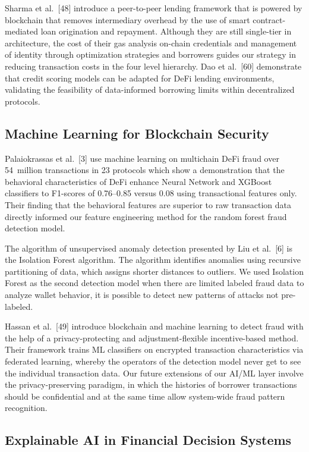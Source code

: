 \documentclass[12pt,a4paper]{report}
\begin{document}
Sharma et al.~[48] introduce a peer-to-peer lending framework that is powered by blockchain that removes intermediary overhead by the use of smart contract-mediated loan origination and repayment. Although they are still single-tier in architecture, the cost of their gas analysis on-chain credentials and management of identity through optimization strategies and borrowers guides our strategy in reducing transaction costs in the four level hierarchy. Dao et al.~[60] demonstrate that credit scoring models can be adapted for DeFi lending environments, validating the feasibility of data-informed borrowing limits within decentralized protocols.

\subsection{Machine Learning for Blockchain Security}

Palaiokrassas et al.~[3] use machine learning on multichain DeFi fraud over 54~million transactions in 23 protocols which show a demonstration that the behavioral characteristics of DeFi enhance Neural Network and XGBoost classifiers to F1-scores of 0.76--0.85 versus 0.08 using transactional features only. Their finding that the behavioral features are superior to raw transaction data directly informed our feature engineering method for the random forest fraud detection model.

The algorithm of unsupervised anomaly detection presented by Liu et al.~[6] is the Isolation Forest algorithm. The algorithm identifies anomalies using recursive partitioning of data, which assigns shorter distances to outliers. We used Isolation Forest as the second detection model when there are limited labeled fraud data to analyze wallet behavior, it is possible to detect new patterns of attacks not pre-labeled.

Hassan et al.~[49] introduce blockchain and machine learning to detect fraud with the help of a privacy-protecting and adjustment-flexible incentive-based method. Their framework trains ML classifiers on encrypted transaction characteristics via federated learning, whereby the operators of the detection model never get to see the individual transaction data. Our future extensions of our AI/ML layer involve the privacy-preserving paradigm, in which the histories of borrower transactions should be confidential and at the same time allow system-wide fraud pattern recognition.

\subsection{Explainable AI in Financial Decision Systems}
\end{document}
